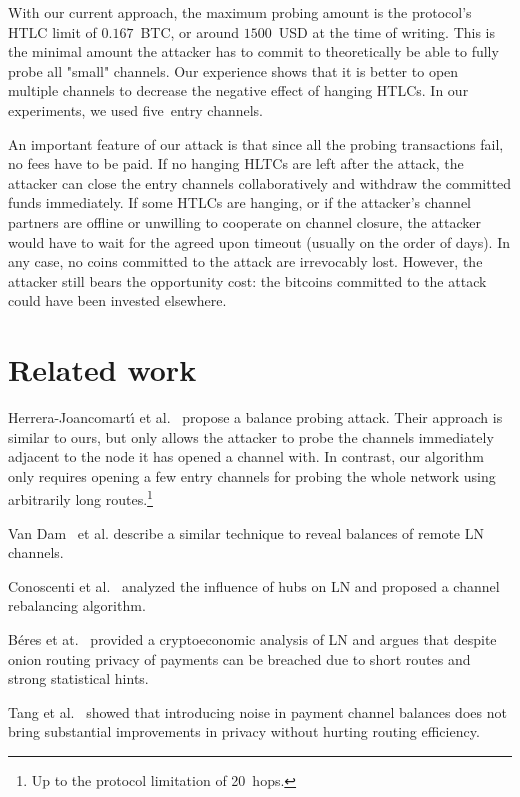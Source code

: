 With our current approach, the maximum probing amount is the protocol's HTLC limit of $0.167$~BTC, or around $1500$~USD at the time of writing.
This is the minimal amount the attacker has to commit to theoretically be able to fully probe all "small" channels.
Our experience shows that it is better to open multiple channels to decrease the negative effect of hanging HTLCs.
In our experiments, we used five~entry channels.

An important feature of our attack is that since all the probing transactions fail, no fees have to be paid.
If no hanging HLTCs are left after the attack, the attacker can close the entry channels collaboratively and withdraw the committed funds immediately.
If some HTLCs are hanging, or if the attacker's channel partners are offline or unwilling to cooperate on channel closure, the attacker would have to wait for the agreed upon timeout (usually on the order of days).
In any case, no coins committed to the attack are irrevocably lost.
However, the attacker still bears the opportunity cost: the bitcoins committed to the attack could have been invested elsewhere.


\section{Related work} \label{sec:related-work}
Herrera{-}Joancomart{\'{\i}} et al.~\cite{HerreraJoancomarti2019} propose a balance probing attack.
Their approach is similar to ours, but only allows the attacker to probe the channels immediately adjacent to the node it has opened a channel with.
In contrast, our algorithm only requires opening a few entry channels for probing the whole network using arbitrarily long routes.\footnote{Up to the protocol limitation of 20~hops.}

Van Dam~\cite{Dam2019} et al. describe a similar technique to reveal balances of remote LN channels.

Conoscenti et al.~\cite{Conoscenti2019} analyzed the influence of hubs on LN and proposed a channel rebalancing algorithm.

B{\'{e}}res et at.~\cite{Beres2019} provided a cryptoeconomic analysis of LN and argues that despite onion routing privacy of payments can be breached due to short routes and strong statistical hints.

Tang et al.~\cite{Tang2019} showed that introducing noise in payment channel balances does not bring substantial improvements in privacy without hurting routing efficiency.

